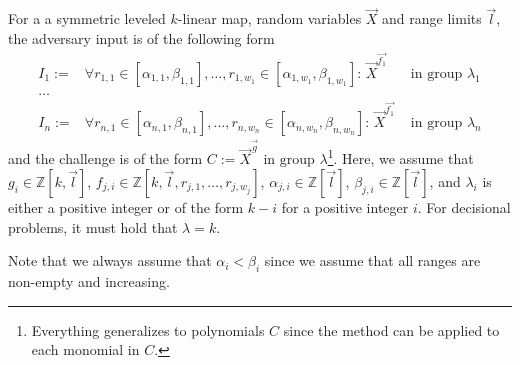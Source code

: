 
\newcommand{\range}[1]{r_{#1} \in [\alpha_{#1},\beta_{#1}]}%
\renewcommand{\brack}[1]{[#1]}%
%
\label{assumption_def}%
For a a symmetric leveled $k$-linear map,
  random variables $\vec{X}$ and range limits $\vec{l}$,
  the adversary input is of the following form
\begin{align*}
  I_1 :={}& \forall \range{1,1},\ldots,\range{1,w_1}:\, \vec{X}^{\vec{f_{1}}} & \text{ in group }\lambda_1\\
  \ldots & \\
  I_n :={}& \forall \range{n,1},\ldots,\range{n,w_n}:\, \vec{X}^{\vec{f_{1}}} & \text{ in group }\lambda_n
\end{align*}
  and the challenge is of the form
  $C := \vec{X}^{\vec{g}} \text{ in group }\lambda$\footnote{
    Everything generalizes to polynomials $C$ since
    the method can be applied to each monomial in $C$.}.
Here, we assume that $g_i \in \mathbb{Z}[k,\vec{l}]$,
  $f_{j,i} \in \mathbb{Z}[k,\vec{l},r_{j,1},\ldots,r_{j,w_j}]$,
  $\alpha_{j,i} \in \mathbb{Z}[\vec{l}]$,
  $\beta_{j,i} \in \mathbb{Z}[\vec{l}]$, and
  $\lambda_i$ is either a positive integer or
  of the form $k - i$ for a positive integer $i$.
For decisional problems, it must hold that $\lambda=k$.

Note that we always assume that $\alpha_i < \beta_i$ since we assume that
  all ranges are non-empty and increasing.